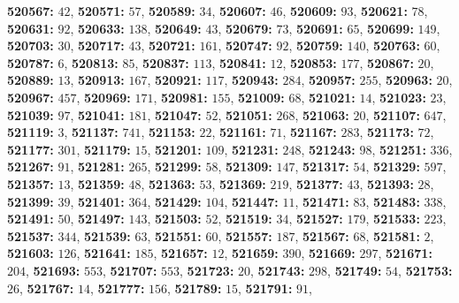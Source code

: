 \textsf{\bfseries 520567:} $42$, \textsf{\bfseries 520571:} $57$, \textsf{\bfseries 520589:} $34$, \textsf{\bfseries 520607:} $46$, \textsf{\bfseries 520609:} $93$, \textsf{\bfseries 520621:} $78$, \textsf{\bfseries 520631:} $92$, \textsf{\bfseries 520633:} $138$, \textsf{\bfseries 520649:} $43$, \textsf{\bfseries 520679:} $73$, \textsf{\bfseries 520691:} $65$, \textsf{\bfseries 520699:} $149$, \textsf{\bfseries 520703:} $30$, \textsf{\bfseries 520717:} $43$, \textsf{\bfseries 520721:} $161$, \textsf{\bfseries 520747:} $92$, \textsf{\bfseries 520759:} $140$, \textsf{\bfseries 520763:} $60$, \textsf{\bfseries 520787:} $6$, \textsf{\bfseries 520813:} $85$, \textsf{\bfseries 520837:} $113$, \textsf{\bfseries 520841:} $12$, \textsf{\bfseries 520853:} $177$, \textsf{\bfseries 520867:} $20$, \textsf{\bfseries 520889:} $13$, \textsf{\bfseries 520913:} $167$, \textsf{\bfseries 520921:} $117$, \textsf{\bfseries 520943:} $284$, \textsf{\bfseries 520957:} $255$, \textsf{\bfseries 520963:} $20$, \textsf{\bfseries 520967:} $457$, \textsf{\bfseries 520969:} $171$, \textsf{\bfseries 520981:} $155$, \textsf{\bfseries 521009:} $68$, \textsf{\bfseries 521021:} $14$, \textsf{\bfseries 521023:} $23$, \textsf{\bfseries 521039:} $97$, \textsf{\bfseries 521041:} $181$, \textsf{\bfseries 521047:} $52$, \textsf{\bfseries 521051:} $268$, \textsf{\bfseries 521063:} $20$, \textsf{\bfseries 521107:} $647$, \textsf{\bfseries 521119:} $3$, \textsf{\bfseries 521137:} $741$, \textsf{\bfseries 521153:} $22$, \textsf{\bfseries 521161:} $71$, \textsf{\bfseries 521167:} $283$, \textsf{\bfseries 521173:} $72$, \textsf{\bfseries 521177:} $301$, \textsf{\bfseries 521179:} $15$, \textsf{\bfseries 521201:} $109$, \textsf{\bfseries 521231:} $248$, \textsf{\bfseries 521243:} $98$, \textsf{\bfseries 521251:} $336$, \textsf{\bfseries 521267:} $91$, \textsf{\bfseries 521281:} $265$, \textsf{\bfseries 521299:} $58$, \textsf{\bfseries 521309:} $147$, \textsf{\bfseries 521317:} $54$, \textsf{\bfseries 521329:} $597$, \textsf{\bfseries 521357:} $13$, \textsf{\bfseries 521359:} $48$, \textsf{\bfseries 521363:} $53$, \textsf{\bfseries 521369:} $219$, \textsf{\bfseries 521377:} $43$, \textsf{\bfseries 521393:} $28$, \textsf{\bfseries 521399:} $39$, \textsf{\bfseries 521401:} $364$, \textsf{\bfseries 521429:} $104$, \textsf{\bfseries 521447:} $11$, \textsf{\bfseries 521471:} $83$, \textsf{\bfseries 521483:} $338$, \textsf{\bfseries 521491:} $50$, \textsf{\bfseries 521497:} $143$, \textsf{\bfseries 521503:} $52$, \textsf{\bfseries 521519:} $34$, \textsf{\bfseries 521527:} $179$, \textsf{\bfseries 521533:} $223$, \textsf{\bfseries 521537:} $344$, \textsf{\bfseries 521539:} $63$, \textsf{\bfseries 521551:} $60$, \textsf{\bfseries 521557:} $187$, \textsf{\bfseries 521567:} $68$, \textsf{\bfseries 521581:} $2$, \textsf{\bfseries 521603:} $126$, \textsf{\bfseries 521641:} $185$, \textsf{\bfseries 521657:} $12$, \textsf{\bfseries 521659:} $390$, \textsf{\bfseries 521669:} $297$, \textsf{\bfseries 521671:} $204$, \textsf{\bfseries 521693:} $553$, \textsf{\bfseries 521707:} $553$, \textsf{\bfseries 521723:} $20$, \textsf{\bfseries 521743:} $298$, \textsf{\bfseries 521749:} $54$, \textsf{\bfseries 521753:} $26$, \textsf{\bfseries 521767:} $14$, \textsf{\bfseries 521777:} $156$, \textsf{\bfseries 521789:} $15$, \textsf{\bfseries 521791:} $91$, 
